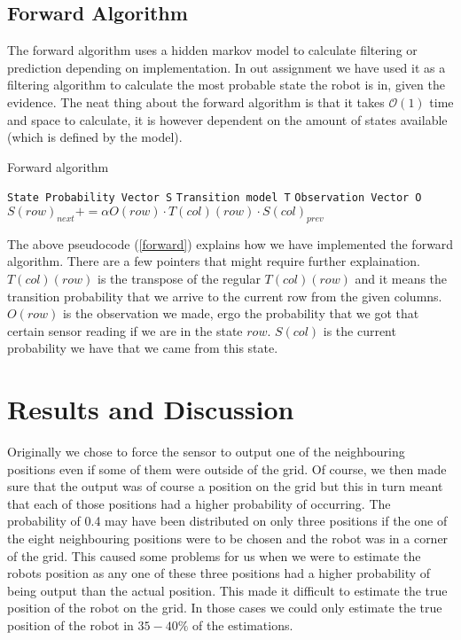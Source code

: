 \documentclass[a4paper]{article}
\begin{document}
\subsection{Forward Algorithm}
\label{for_alg}
The forward algorithm uses a hidden markov model to calculate filtering or prediction depending on implementation. In out assignment we have used it as a filtering algorithm to calculate the most probable state the robot is in, given the evidence. The neat thing about the forward algorithm is that it takes $\mathcal{O}(1)$ time and space to calculate, it is however dependent on the amount of states available (which is defined by the model). 

\begin{algorithm}
  \caption{Forward algorithm}\label{forward}
  \begin{algorithmic}[1]
      \State \texttt{State Probability Vector S}
      \State \texttt{Transition model T}
      \State \texttt{Observation Vector O}
      		\State $S(row)_{next} += \alpha O(row) \cdot T(col)(row) \cdot S(col)_{prev}$
      	\EndFor
      \EndFor
  \end{algorithmic}
\end{algorithm}

The above pseudocode (\ref{forward}) explains how we have implemented the forward algorithm. There are a few pointers that might require further explaination. $T(col)(row)$ is the transpose of the regular $T(col)(row)$ and it means the transition probability that we arrive to the current row from the given columns. $O(row)$ is the observation we made, ergo the probability that we got that certain sensor reading if we are in the state $row$. $S(col)$ is the current probability we have that we came from this state.

\section{Results and Discussion}
Originally we chose to force the sensor to output one of the neighbouring positions even if some of them were outside of the grid. Of course, we then made sure that the output was of course a position on the grid but this in turn meant that each of those positions had a higher probability of occurring. The probability of 0.4 may have been distributed on only three positions if the one of the eight neighbouring positions were to be chosen and the robot was in a corner of the grid. This caused some problems for us when we were to estimate the robots position as any one of these three positions had a higher probability of being output than the actual position. This made it difficult to estimate the true position of the robot on the grid. In those cases we could only estimate the true position of the robot in $35 - 40\%$ of the estimations.
\end{document}
